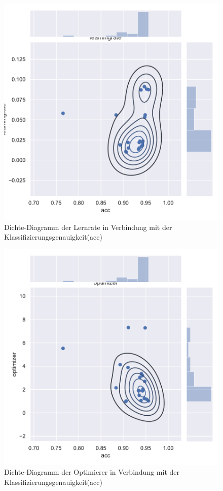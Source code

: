\begin{figure}[H]
  \centering  
  \includegraphics[scale=0.5]{anhang/GA_50_mnist_digits_True_small_jointplot_learningrate.pdf}
  \caption{Dichte-Diagramm der Lernrate in Verbindung mit der Klassifizierungsgenauigkeit(acc)}
  
\end{figure}

\begin{figure}[H]
  \centering  
  \includegraphics[scale=0.5]{anhang/GA_50_mnist_digits_True_small_jointplot_optimizer.pdf}
  \caption{Dichte-Diagramm der Optimierer in Verbindung mit der Klassifizierungsgenauigkeit(acc)}
  
\end{figure}

